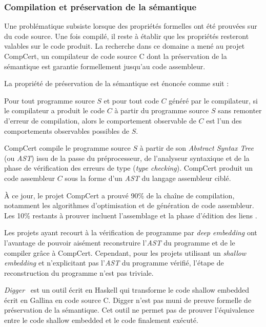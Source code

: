 			\subsubsection{Compilation et préservation de la sémantique}
			\label{compilation}
				Une problématique subsiste lorsque des propriétés formelles ont été prouvées sur du code source. Une fois compilé, il reste à établir que les propriétés resteront valables sur le code produit. La recherche dans ce domaine a mené au projet CompCert\cite{Leroy-backend}, un compilateur de code source C dont la préservation de la sémantique est garantie formellement jusqu'au code assembleur.

	La propriété de préservation de la sémantique est énoncée comme suit :

\begin{theorem}	
	Pour tout programme source $S$ et pour tout code $C$ généré par le compilateur, si le compilateur a produit le code $C$ à partir du programme source $S$ sans remonter d'erreur de compilation, alors le comportement observable de $C$ est l'un des comportements observables possibles de $S$.
\end{theorem}

CompCert compile le programme source $S$ à partir de son \emph{Abstract Syntax Tree} (ou \emph{AST}) issu de la passe du préprocesseur, de l'analyseur syntaxique et de la phase de vérification des erreurs de type (\emph{type checking}). CompCert produit un code assembleur $C$ sous la forme d'un \emph{AST} du langage assembleur ciblé.

À ce jour, le projet CompCert a prouvé 90\% de la chaîne de compilation, notamment les algorithmes d'optimisation et de génération de code assembleur. Les 10\% restants à prouver incluent l'assemblage et la phase d'édition des liens \cite{compcert_online}.

Les projets ayant recourt à la vérification de programme par \emph{deep embedding} ont l'avantage de pouvoir aisément reconstruire l'\emph{AST} du programme et de le compiler grâce à CompCert. Cependant, pour les projets utilisant un \emph{shallow embedding} et n'explicitant pas l'\emph{AST} du programme vérifié, l'étape de reconstruction du programme n'est pas triviale.

\emph{Digger}~\cite{digger} est un outil écrit en Haskell qui transforme le code shallow embedded écrit en Gallina en code source C. Digger n'est pas muni de preuve formelle de préservation de la sémantique. Cet outil ne permet pas de prouver l'équivalence entre le code shallow embedded et le code finalement exécuté.


